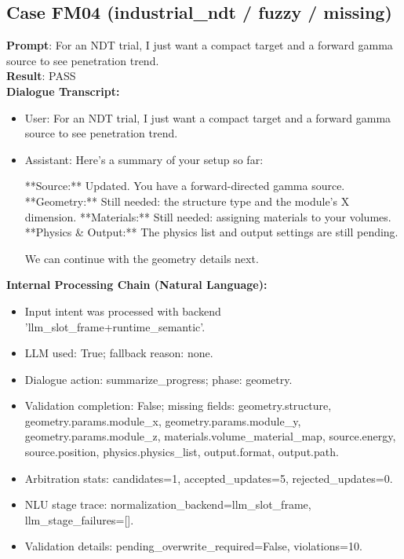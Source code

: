 \documentclass[11pt]{ctexart}
\begin{document}
\subsection{Case FM04 (industrial\_ndt / fuzzy / missing)}
\textbf{Prompt}: For an NDT trial, I just want a compact target and a forward gamma source to see penetration trend.\\
\textbf{Result}: PASS\\
\textbf{Dialogue Transcript:}
\begin{itemize}
\item User: For an NDT trial, I just want a compact target and a forward gamma source to see penetration trend.
\item Assistant: Here's a summary of your setup so far:

**Source:** Updated. You have a forward-directed gamma source.
**Geometry:** Still needed: the structure type and the module's X dimension.
**Materials:** Still needed: assigning materials to your volumes.
**Physics \& Output:** The physics list and output settings are still pending.

We can continue with the geometry details next.
\end{itemize}
\textbf{Internal Processing Chain (Natural Language):}
\begin{itemize}
\item Input intent was processed with backend 'llm\_slot\_frame+runtime\_semantic'.
\item LLM used: True; fallback reason: none.
\item Dialogue action: summarize\_progress; phase: geometry.
\item Validation completion: False; missing fields: geometry.structure, geometry.params.module\_x, geometry.params.module\_y, geometry.params.module\_z, materials.volume\_material\_map, source.energy, source.position, physics.physics\_list, output.format, output.path.
\item Arbitration stats: candidates=1, accepted\_updates=5, rejected\_updates=0.
\item NLU stage trace: normalization\_backend=llm\_slot\_frame, llm\_stage\_failures=[].
\item Validation details: pending\_overwrite\_required=False, violations=10.
\end{itemize}
\end{document}
